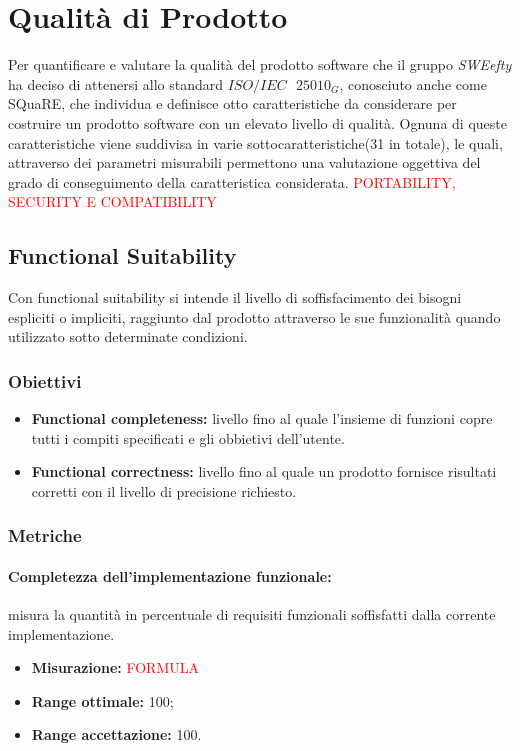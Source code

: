 \section{Qualità di Prodotto}
Per quantificare e valutare la qualità del prodotto software che il gruppo \textit{SWEefty} ha deciso di attenersi allo standard $ISO/IEC\text{ }25010_G$, conosciuto anche come SQuaRE, che individua e definisce otto caratteristiche da considerare per costruire un prodotto software con un elevato livello di qualità. Ognuna di queste caratteristiche viene suddivisa in varie sottocaratteristiche(31 in totale), le quali, attraverso dei parametri misurabili  permettono una valutazione oggettiva del grado di conseguimento della caratteristica considerata.
\textcolor{red}{PORTABILITY, SECURITY E COMPATIBILITY}
 
	\subsection{Functional Suitability}
	Con functional suitability si intende il livello di soffisfacimento dei bisogni espliciti o impliciti, raggiunto dal prodotto attraverso le sue funzionalità quando utilizzato sotto determinate condizioni.
		\subsubsection{Obiettivi}
			\begin{itemize}
				\item {\textbf{Functional completeness:} livello fino al quale l'insieme di funzioni copre tutti i compiti specificati e gli obbietivi dell'utente.}
				\item {\textbf{Functional correctness:} livello fino al quale un prodotto fornisce risultati corretti con il livello di precisione richiesto.}
			\end{itemize}
		\subsubsection{Metriche}
			\paragraph{Completezza dell'implementazione funzionale:} misura la quantità in percentuale di requisiti funzionali soffisfatti dalla corrente implementazione.
			\begin{itemize}
				\item {\textbf{Misurazione:} \textcolor{red}{FORMULA}}
				\item {\textbf{Range ottimale:} 100;}
				\item {\textbf{Range accettazione:} 100.}
			\end{itemize} 

